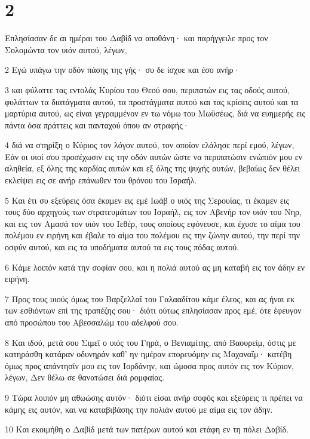 \chapter{2}

\par Επλησίασαν δε αι ημέραι του Δαβίδ να αποθάνη· και παρήγγειλε προς τον Σολομώντα τον υιόν αυτού, λέγων,
\par 2 Εγώ υπάγω την οδόν πάσης της γής· συ δε ίσχυε και έσο ανήρ·
\par 3 και φύλαττε τας εντολάς Κυρίου του Θεού σου, περιπατών εις τας οδούς αυτού, φυλάττων τα διατάγματα αυτού, τα προστάγματα αυτού και τας κρίσεις αυτού και τα μαρτύρια αυτού, ως είναι γεγραμμένον εν τω νόμω του Μωϋσέως, διά να ευημερής εις πάντα όσα πράττεις και πανταχού όπου αν στραφής·
\par 4 διά να στηρίξη ο Κύριος τον λόγον αυτού, τον οποίον ελάλησε περί εμού, λέγων, Εάν οι υιοί σου προσέχωσιν εις την οδόν αυτών ώστε να περιπατώσιν ενώπιόν μου εν αληθεία, εξ όλης της καρδίας αυτών και εξ όλης της ψυχής αυτών, βεβαίως δεν θέλει εκλείψει εις σε ανήρ επάνωθεν του θρόνου του Ισραήλ.
\par 5 Και έτι συ εξεύρεις όσα έκαμεν εις εμέ Ιωάβ ο υιός της Σερουΐας, τι έκαμεν εις τους δύο αρχηγούς των στρατευμάτων του Ισραήλ, εις τον Αβενήρ τον υιόν του Νηρ, και εις τον Αμασά τον υιόν του Ιεθέρ, τους οποίους εφόνευσε, και έχυσε το αίμα του πολέμου εν ειρήνη και έβαλε το αίμα του πολέμου εις την ζώνην αυτού, την περί την οσφύν αυτού, και εις τα υποδήματα αυτού τα εις τους πόδας αυτού.
\par 6 Κάμε λοιπόν κατά την σοφίαν σου, και η πολιά αυτού ας μη καταβή εις τον άδην εν ειρήνη.
\par 7 Προς τους υιούς όμως του Βαρζελλαΐ του Γαλααδίτου κάμε έλεος, και ας ήναι εκ των εσθιόντων επί της τραπέζης σου· διότι ούτως επλησίασαν προς εμέ, ότε έφευγον από προσώπου του Αβεσσαλώμ του αδελφού σου.
\par 8 Και ιδού, μετά σου Σιμεΐ ο υιός του Γηρά, ο Βενιαμίτης, από Βαουρείμ, όστις με κατηράσθη κατάραν οδυνηράν καθ' ην ημέραν επορευόμην εις Μαχαναΐμ· κατέβη όμως προς απάντησίν μου εις τον Ιορδάνην, και ώμοσα προς αυτόν εις τον Κύριον, λέγων, Δεν θέλω σε θανατώσει διά ρομφαίας.
\par 9 Τώρα λοιπόν μη αθωώσης αυτόν· διότι είσαι ανήρ σοφός και εξεύρεις τι πρέπει να κάμης εις αυτόν, και να καταβιβάσης την πολιάν αυτού με αίμα εις τον άδην.
\par 10 Και εκοιμήθη ο Δαβίδ μετά των πατέρων αυτού και ετάφη εν τη πόλει Δαβίδ.
